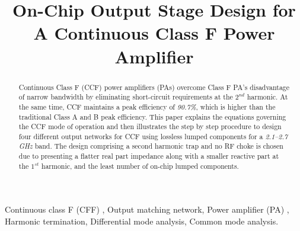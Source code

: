 \documentclass[conference]{IEEEtran}
\begin{document}
\title{\color{blue} On-Chip \color{black} Output Stage Design for  \color{blue} A \color{black} Continuous Class F Power Amplifier}

\author{ 
}

\maketitle

\begin{abstract}
Continuous Class F (CCF) power amplifiers (PAs) overcome Class F PA's disadvantage of narrow bandwidth by eliminating \color{blue} short-circuit requirements at the $2^{nd}$ harmonic. \color{black} At the same time, CCF maintains \color{blue} a \color{black} peak efficiency of \textit{90.7\%}\color{blue}, \color{black} which is higher than the traditional Class A and \color{blue} B \color{black} peak efficiency. This paper explains the equations governing the CCF mode of operation and then illustrates the step by step procedure to design \color{blue} four \color{black} different output networks for CCF using lossless lumped components for \color{blue} a \textit{2.1--2.7 GHz} band. \color{black}
The design comprising \color{blue} a \color{black} second harmonic trap and no RF choke is chosen \color{blue} due to presenting \color{black} a flatter real part \color{blue} impedance \color{black} \color{blue} along with \color{black} a smaller reactive part at the $1^{st}$ harmonic\color{blue}, and \color{black} the least number of \color{blue} on-chip \color{black} lumped components.
\end{abstract}

\vspace{1mm}
\begin{IEEEkeywords}
Continuous class F \color{blue} (CFF) \color{black} , Output matching network, Power amplifier \color{blue} (PA) \color{black} , Harmonic termination, Differential mode analysis, Common mode analysis. 
\end{IEEEkeywords}
\end{document}
